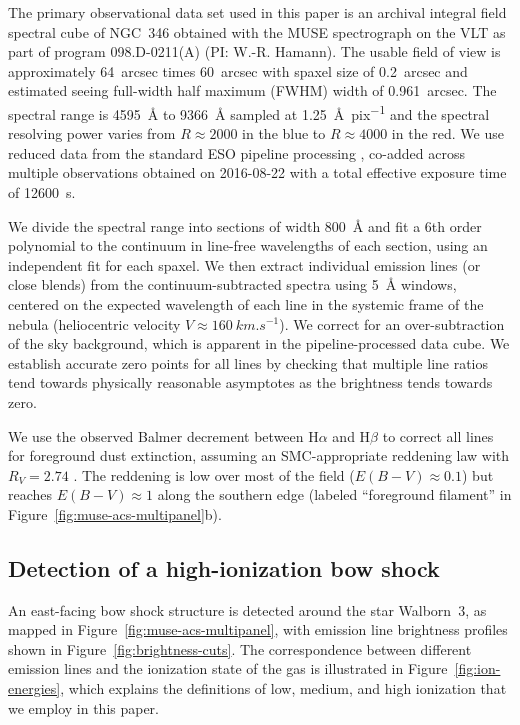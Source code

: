 \documentclass[useAMS, usenatbib, a4paper]{mnras}
\newcommand\ha{\ensuremath{\text{H}\alpha}}
\newcommand\hb{\ensuremath{\text{H}\beta}}
\begin{document}
The primary observational data set used in this paper
is an archival integral field spectral cube of NGC~346
obtained with the MUSE spectrograph \citep{Bacon:2010a, Bacon:2014a}
on the VLT as part of program 098.D-0211(A) (PI:  W.-R. Hamann). 
The usable field of view is approximately
\SI{64}{arcsec} times \SI{60}{arcsec} with
spaxel size of \SI{0.2}{arcsec} and estimated seeing
full-width half maximum (FWHM) width of \SI{0.961}{arcsec}.
The spectral range is \SI{4595}{\angstrom} to \SI{9366}{\angstrom}
sampled at \SI{1.25}{\angstrom.pix^{-1}} and the
spectral resolving power varies from \(R \approx 2000\) in the blue
to \(R \approx 4000\) in the red.
We use reduced data from the standard ESO pipeline processing
\citep{Weilbacher:2020a},
co-added across multiple observations obtained on \mbox{2016-08-22}
with a total effective exposure time of \SI{12600}{s}.

We divide the spectral range into sections of width \SI{800}{\angstrom}
and fit a 6th order polynomial to the continuum
in line-free wavelengths of each section,
using an independent fit for each spaxel.
We then extract individual emission lines (or close blends)
from the continuum-subtracted spectra using \SI{5}{\angstrom} windows,
centered on the expected wavelength of each line
in the systemic frame of the nebula
(heliocentric velocity \(V \approx \SI{+160}{km.s^{-1}}\)).
We correct for an over-subtraction of the sky background,
which is apparent in the pipeline-processed data cube.
We establish accurate zero points for all lines by checking that
multiple line ratios tend towards physically reasonable asymptotes
as the brightness tends towards zero.

We use the observed Balmer decrement between \ha{} and \hb{} to
correct all lines for foreground dust extinction, assuming
an SMC-appropriate reddening law with \(R_V = 2.74\)
\citep{Fitzpatrick:1990a, Gordon:2003l}.
The reddening is low over most of the field
(\(E(B - V) \approx 0.1\))
but reaches \(E(B - V) \approx 1\) along the southern edge
(labeled ``foreground filament'' in
Figure~\ref{fig:muse-acs-multipanel}b).


\subsection{Detection of a high-ionization bow shock}
\label{sec:results}
An east-facing bow shock structure is detected
around the star Walborn~3,
as mapped in Figure~\ref{fig:muse-acs-multipanel},
with emission line brightness profiles shown in
Figure~\ref{fig:brightness-cuts}.
The correspondence between different emission lines
and the ionization state of the gas is illustrated
in Figure~\ref{fig:ion-energies},
which explains the definitions of low, medium, and
high ionization that we employ in this paper.
\end{document}

